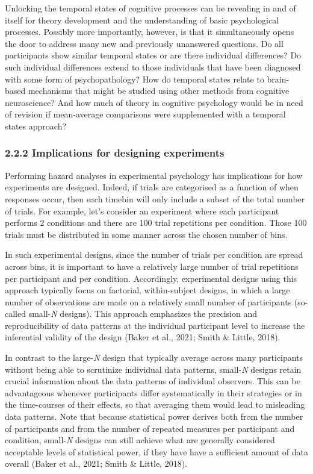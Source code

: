 \documentclass[
  man,floatsintext]{apa6}
\begin{document}
Unlocking the temporal states of cognitive processes can be revealing in and of itself for theory development and the understanding of basic psychological processes. Possibly more importantly, however, is that it simultaneously opens the door to address many new and previously unanswered questions. Do all participants show similar temporal states or are there individual differences? Do such individual differences extend to those individuals that have been diagnosed with some form of psychopathology? How do temporal states relate to brain-based mechanisms that might be studied using other methods from cognitive neuroscience? And how much of theory in cognitive psychology would be in need of revision if mean-average comparisons were supplemented with a temporal states approach?

\subsubsection{2.2.2 Implications for designing experiments}\label{implications-for-designing-experiments}

Performing hazard analyses in experimental psychology has implications for how experiments are designed. Indeed, if trials are categorised as a function of when responses occur, then each timebin will only include a subset of the total number of trials. For example, let's consider an experiment where each participant performs 2 conditions and there are 100 trial repetitions per condition. Those 100 trials must be distributed in some manner across the chosen number of bins.

In such experimental designs, since the number of trials per condition are spread across bins, it is important to have a relatively large number of trial repetitions per participant and per condition. Accordingly, experimental designs using this approach typically focus on factorial, within-subject designs, in which a large number of observations are made on a relatively small number of participants (so-called small-\emph{N} designs). This approach emphasizes the precision and reproducibility of data patterns at the individual participant level to increase the inferential validity of the design (Baker et al., 2021; Smith \& Little, 2018).

In contrast to the large-\emph{N} design that typically average across many participants without being able to scrutinize individual data patterns, small-\emph{N} designs retain crucial information about the data patterns of individual observers. This can be advantageous whenever participants differ systematically in their strategies or in the time-courses of their effects, so that averaging them would lead to misleading data patterns. Note that because statistical power derives both from the number of participants and from the number of repeated measures per participant and condition, small-\emph{N} designs can still achieve what are generally considered acceptable levels of statistical power, if they have have a sufficient amount of data overall (Baker et al., 2021; Smith \& Little, 2018).
\end{document}
